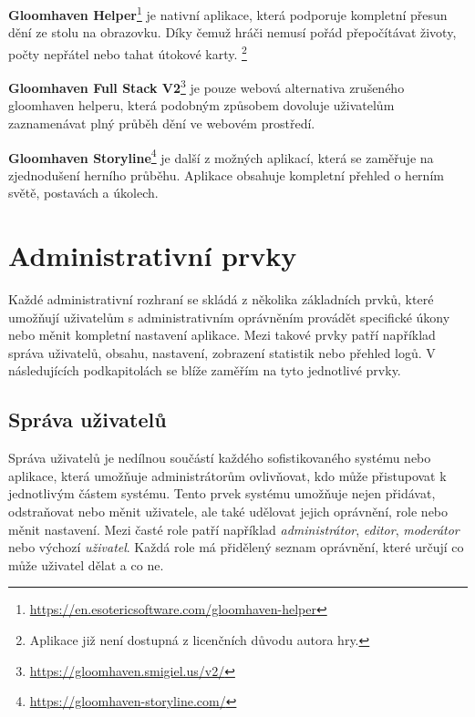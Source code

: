 \begin{description}
    \item \textbf{Gloomhaven Helper}\footnote{\href{https://en.esotericsoftware.com/gloomhaven-helper}{https://en.esotericsoftware.com/gloomhaven-helper}} je nativní aplikace, která podporuje kompletní přesun dění ze stolu na obrazovku. Díky čemuž hráči nemusí pořád přepočítávat životy, počty nepřátel nebo tahat útokové karty. \footnote{Aplikace již není dostupná z licenčních důvodu autora hry.}
    \item \textbf{Gloomhaven Full Stack V2}\footnote{\href{https://gloomhaven.smigiel.us/v2/}{https://gloomhaven.smigiel.us/v2/}} je pouze webová alternativa zrušeného gloomhaven helperu, která podobným způsobem dovoluje uživatelům zaznamenávat plný průběh dění ve webovém prostředí.
    \item \textbf{Gloomhaven Storyline}\footnote{\href{https://gloomhaven-storyline.com/}{https://gloomhaven-storyline.com/}} je další z možných aplikací, která se zaměřuje na zjednodušení herního průběhu. Aplikace obsahuje kompletní přehled o herním světě, postavách a úkolech.
\end{description}

\section{Administrativní prvky}
\label{sec:admin-elements}
Každé administrativní rozhraní se skládá z několika základních prvků, které umožňují uživatelům s administrativním oprávněním provádět specifické úkony nebo měnit kompletní nastavení aplikace. Mezi takové prvky patří například správa uživatelů, obsahu, nastavení, zobrazení statistik nebo přehled logů. V následujících podkapitolách se blíže zaměřím na tyto jednotlivé prvky.

\subsection{Správa uživatelů}
\label{subsec:admin-elements-user-management}
Správa uživatelů je nedílnou součástí každého sofistikovaného systému nebo aplikace, která umožňuje administrátorům ovlivňovat, kdo může přistupovat k jednotlivým částem systému. Tento prvek systému umožňuje nejen přidávat, odstraňovat nebo měnit uživatele, ale také udělovat jejich oprávnění, role nebo měnit nastavení. Mezi časté role patří například \textit{administrátor}, \textit{editor}, \textit{moderátor} nebo výchozí \textit{uživatel}. Každá role má přidělený seznam oprávnění, které určují co může uživatel dělat a co ne.

